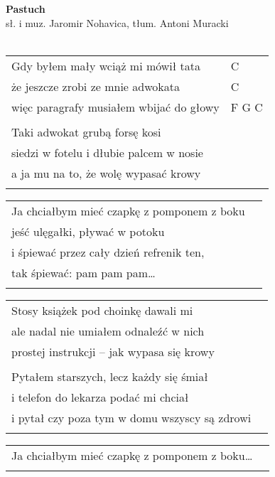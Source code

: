 \documentclass[a5paper]{article}
\begin{document}


\noindent
\fontsize{12pt}{15pt}\selectfont
\textbf{Pastuch} \\
\fontsize{8pt}{10pt}\selectfont
sł. i muz. Jaromir Nohavica, tłum. Antoni Muracki \\ \\
\fontsize{10pt}{12pt}\selectfont
{}
\begin{tabular}{@{}p{7.50cm}p{3cm}@{}}
\noindent
Gdy byłem mały wciąż mi mówił tata & C \\
że jeszcze zrobi ze mnie adwokata & C \\
więc paragrafy musiałem wbijać do głowy & F G C \\ \\

Taki adwokat grubą forsę kosi \\
siedzi w fotelu i dłubie palcem w nosie \\
a ja mu na to, że wolę wypasać krowy \\ \\
\end{tabular}

\noindent
\begin{tabular}{@{}p{10.50cm}p{3cm}@{}}
Ja chciałbym mieć czapkę z pomponem z boku \\
jeść ulęgałki, pływać w potoku \\
i śpiewać przez cały dzień refrenik ten, \\
tak śpiewać: pam pam pam… \\ \\
\end{tabular}

\noindent
\begin{tabular}{@{}p{10.50cm}p{3cm}@{}}
Stosy książek pod choinkę dawali mi \\
ale nadal nie umiałem odnaleźć w nich \\
prostej instrukcji – jak wypasa się krowy \\ \\

Pytałem starszych, lecz każdy się śmiał \\
i telefon do lekarza podać mi chciał \\
i pytał czy poza tym w domu wszyscy są zdrowi \\ \\
\end{tabular}

\noindent
\begin{tabular}{@{}p{10.50cm}p{3cm}@{}}
Ja chciałbym mieć czapkę z pomponem z boku… \\ \\
\end{tabular}
\end{document}
